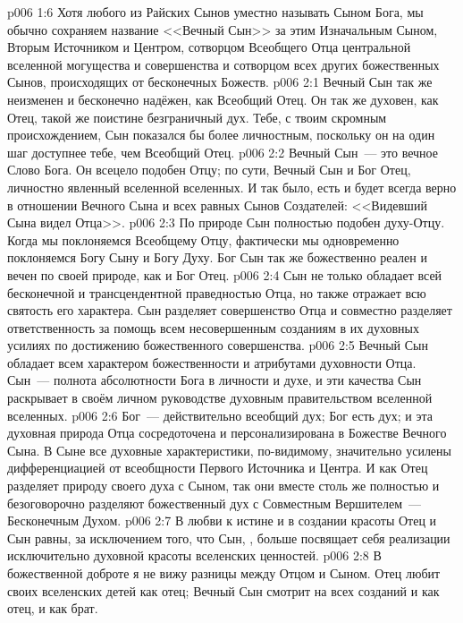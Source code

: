 \vs p006 1:6 Хотя любого из Райских Сынов уместно называть Сыном Бога, мы обычно сохраняем название <<Вечный Сын>> за этим Изначальным Сыном, Вторым Источником и Центром, сотворцом Всеобщего Отца центральной вселенной могущества и совершенства и сотворцом всех других божественных Сынов, происходящих от бесконечных Божеств.
\vs p006 2:1 Вечный Сын так же неизменен и бесконечно надёжен, как Всеобщий Отец. Он так же духовен, как Отец, такой же поистине безграничный дух. Тебе, с твоим скромным происхождением, Сын показался бы более личностным, поскольку он на один шаг доступнее тебе, чем Всеобщий Отец.
\vs p006 2:2 Вечный Сын~--- это вечное Слово Бога. Он всецело подобен Отцу; по сути, Вечный Сын и  Бог Отец, личностно явленный вселенной вселенных. И так было, есть и будет всегда верно в отношении Вечного Сына и всех равных Сынов Создателей: <<Видевший Сына видел Отца>>.
\vs p006 2:3 По природе Сын полностью подобен духу\hyp{}Отцу. Когда мы поклоняемся Всеобщему Отцу, фактически мы одновременно поклоняемся Богу Сыну и Богу Духу. Бог Сын так же божественно реален и вечен по своей природе, как и Бог Отец.
\vs p006 2:4 Сын не только обладает всей бесконечной и трансцендентной праведностью Отца, но также отражает всю святость его характера. Сын разделяет совершенство Отца и совместно разделяет ответственность за помощь всем несовершенным созданиям в их духовных усилиях по достижению божественного совершенства.
\vs p006 2:5 Вечный Сын обладает всем характером божественности и атрибутами духовности Отца. Сын~---  полнота абсолютности Бога в личности и духе, и эти качества Сын раскрывает в своём личном руководстве духовным правительством вселенной вселенных.
\vs p006 2:6 Бог~--- действительно всеобщий дух; Бог есть дух; и эта духовная природа Отца сосредоточена и персонализирована в Божестве Вечного Сына. В Сыне все духовные характеристики, по\hyp{}видимому, значительно усилены дифференциацией от всеобщности Первого Источника и Центра. И как Отец разделяет природу своего духа с Сыном, так они вместе столь же полностью и безоговорочно разделяют божественный дух с Совместным Вершителем~--- Бесконечным Духом.
\vs p006 2:7 В любви к истине и в создании красоты Отец и Сын равны, за исключением того, что Сын, , больше посвящает себя реализации исключительно духовной красоты вселенских ценностей.
\vs p006 2:8 В божественной доброте я не вижу разницы между Отцом и Сыном. Отец любит своих вселенских детей как отец; Вечный Сын смотрит на всех созданий и как отец, и как брат.
